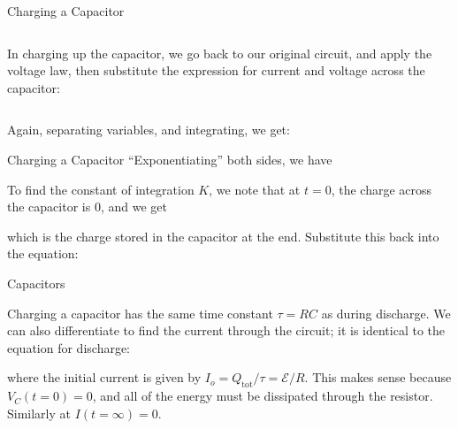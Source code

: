 \documentclass[12pt,aspectratio=169]{beamer}
\begin{document}
\begin{frame}{Charging a Capacitor}
  \begin{columns}
    \centering
    
    In charging up the capacitor, we go back to our original circuit, and apply
    the voltage law, then substitute the expression for current and voltage
    across the capacitor:

  \end{columns}
  \vspace{.2in}Again, separating variables, and integrating, we get:

 \end{frame}



\begin{frame}{Charging a Capacitor}
  ``Exponentiating'' both sides, we have
  

  To find the constant of integration $K$, we note that at $t=0$, the charge
  across the capacitor is $0$, and we get


  which is the charge stored in the capacitor at the end. Substitute this back
  into the equation:

\end{frame}




\begin{frame}{Capacitors}


  Charging a capacitor has the same time constant $\tau=RC$ as during
  discharge. We can also differentiate to find the current through the circuit;
  it is identical to the equation for discharge:


  where the initial current is given by $I_o=Q_\text{tot}/\tau=\mathcal E/R$.
  This makes sense because $V_C(t=0)=0$, and all of the energy must be
  dissipated through the resistor. Similarly at $I(t=\infty)=0$.
\end{frame}
\end{document}
